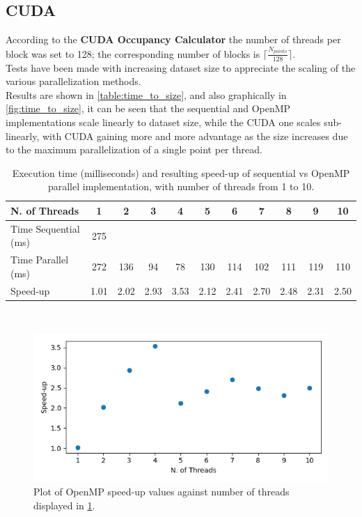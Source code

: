 \documentclass[10pt,twocolumn,letterpaper]{article}
\begin{document}
\subsection{CUDA}
According to the \textbf{CUDA Occupancy Calculator} the number of threads per block was set to 128; the corresponding number of blocks is $\lceil \frac{N_{points}}{128} \rceil$.\\
Tests have been made with increasing dataset size to appreciate the scaling of the various parallelization methods.\\
Results are shown in \cref{table:time_to_size}, and also graphically in \cref{fig:time_to_size}, it can be seen that the sequential and OpenMP implementations scale linearly to dataset size, while the CUDA one scales sub-linearly, with CUDA gaining more and more advantage as the size increases due to the maximum parallelization of a single point per thread.\\

\begin{table}[h]
	\centering
	\begin{tabular}{|l|c|c|c|c|c|c|c|c|c|c|}
		\hline
		N. of Threads        & 1    & 2    & 3    & 4    & 5    & 6    & 7    & 8    & 9    & 10   \\ \hline
		Time Sequential (ms) & 275  &      &      &      &      &      &      &      &      &      \\ \hline
		Time Parallel (ms)   & 272  & 136  & 94   & 78   & 130  & 114  & 102  & 111  & 119  & 110  \\ \hline
		Speed-up             & 1.01 & 2.02 & 2.93 & 3.53 & 2.12 & 2.41 & 2.70 & 2.48 & 2.31 & 2.50 \\ \hline
	\end{tabular}\\
	\bigskip
	\caption{Execution time (milliseconds) and resulting speed-up of sequential vs OpenMP parallel implementation, with number of threads from 1 to 10.}
	\label{table:speedup}
\end{table}
\begin{figure}[h]
	\begin{center}
		\includegraphics[width=\textwidth]{img/speedup_OMP.png}
	\end{center}
	\caption{Plot of OpenMP speed-up values against number of threads displayed in \cref{table:speedup}.}
	\label{fig:speedup}
\end{figure}
\end{document}

